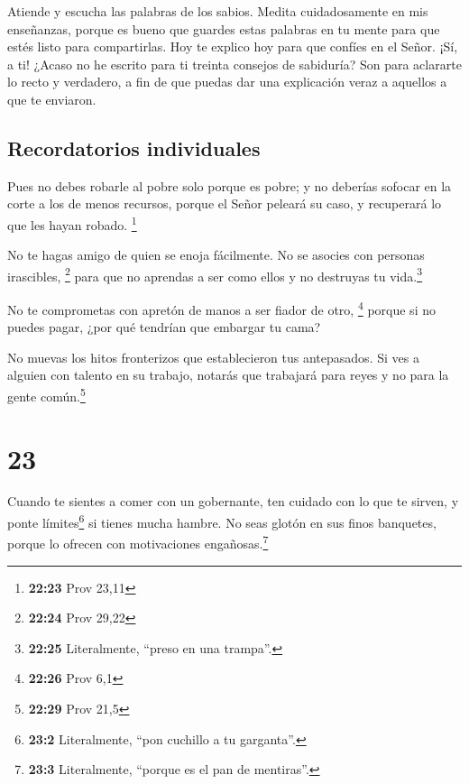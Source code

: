 Atiende y escucha las palabras de los sabios. Medita
cuidadosamente en mis enseñanzas,  porque es bueno que
guardes estas palabras en tu mente para que estés listo para
compartirlas.  Hoy te explico hoy para que confíes en el
Señor. ¡Sí, a ti!  ¿Acaso no he escrito para ti treinta
consejos de sabiduría?  Son para aclararte lo recto y
verdadero, a fin de que puedas dar una explicación veraz a aquellos a
que te enviaron.

\hypertarget{recordatorios-individuales}{%
\subsection{Recordatorios
individuales}\label{recordatorios-individuales}}

 Pues no debes robarle al pobre solo porque es pobre; y
no deberías sofocar en la corte a los de menos recursos, 
porque el Señor peleará su caso, y recuperará lo que les hayan robado.
\footnote{\textbf{22:23} Prov 23,11}

 No te hagas amigo de quien se enoja fácilmente. No se
asocies con personas irascibles, \footnote{\textbf{22:24} Prov 29,22}
 para que no aprendas a ser como ellos y no destruyas tu
vida.\footnote{\textbf{22:25} Literalmente, ``preso en una trampa''.}

 No te comprometas con apretón de manos a ser fiador de
otro, \footnote{\textbf{22:26} Prov 6,1}  porque si no
puedes pagar, ¿por qué tendrían que embargar tu cama?

 No muevas los hitos fronterizos que establecieron tus
antepasados.  Si ves a alguien con talento en su trabajo,
notarás que trabajará para reyes y no para la gente común.\footnote{\textbf{22:29}
  Prov 21,5}

\hypertarget{section-22}{%
\section{23}\label{section-22}}

 Cuando te sientes a comer con un gobernante, ten cuidado
con lo que te sirven,  y ponte límites\footnote{\textbf{23:2}
  Literalmente, ``pon cuchillo a tu garganta''.} si tienes mucha hambre.
 No seas glotón en sus finos banquetes, porque lo ofrecen
con motivaciones engañosas.\footnote{\textbf{23:3} Literalmente,
  ``porque es el pan de mentiras''.}

